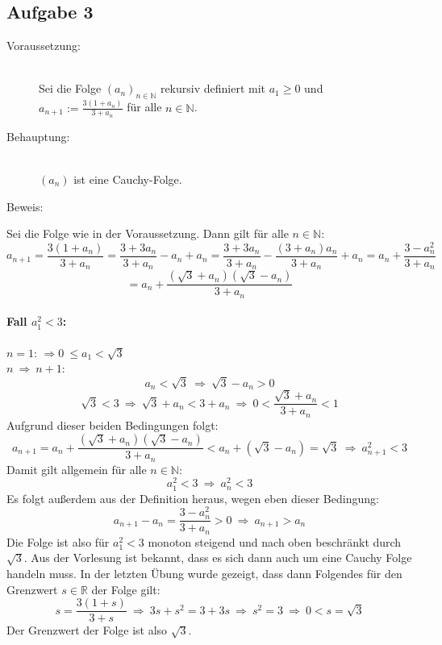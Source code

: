 \documentclass[10pt, a4paper]{article}
\begin{document}


	\newpage

	\subsection*{Aufgabe 3} %
	\label{sub:aufgabe_3}
	
		\begin{description}
			\item[Voraussetzung:] \hfill \\
				Sei die Folge $(a_n)_{n\in \mathbb{N}}$ rekursiv definiert mit $a_1\geq 0$ und \\
				$a_{n+1}:=\frac{3(1+a_n)}{3+a_n}$ für alle $n \in \mathbb{N}$.
			\item[Behauptung:] \hfill \\
				$(a_n)$ ist eine Cauchy-Folge.
			\item[Beweis:]
		\end{description}
		
			Sei die Folge wie in der Voraussetzung. Dann gilt für alle $n \in \mathbb{N}$:
			\[
				a_{n+1} = \dfrac{3(1+a_n)}{3+a_n} = \dfrac{3+3a_n}{3+a_n}-a_n+a_n = \dfrac{3+3a_n}{3+a_n} - \dfrac{(3+a_n)a_n}{3+a_n} +a_n = a_n + \dfrac{3-a_n^2}{3+a_n} 
			\]
			\[
				= a_n + \dfrac{(\sqrt{3}+a_n)(\sqrt{3}-a_n)}{3+a_n} 
			\]

			\paragraph{Fall $a_1^2<3$:} %
			\label{par:fall_}
			
				$n=1$: $\Rightarrow 0 \ \leq a_1 < \sqrt{3}$\\

				$n\ \Rightarrow \ n+1$:
				\[
					a_n < \sqrt{3} \ \Rightarrow \ \sqrt{3}-a_n > 0
				\]
				\[
					\sqrt{3} < 3 \ \Rightarrow \ \sqrt{3}+ a_n < 3+a_n \ \Rightarrow \ 0 < \dfrac{\sqrt{3}+a_n}{3+a_n} < 1
				\]
				Aufgrund dieser beiden Bedingungen folgt:
				\[
					a_{n+1} = a_n + \dfrac{(\sqrt{3}+a_n)(\sqrt{3}-a_n)}{3+a_n} < a_n + (\sqrt{3}-a_n) = \sqrt{3} \ \Rightarrow \ a_{n+1}^2 < 3
				\]
				Damit gilt allgemein für alle $n \in \mathbb{N}$:
				\[
					a_1^2 < 3 \ \Rightarrow \ a_n^2 < 3
				\]
				Es folgt außerdem aus der Definition heraus, wegen eben dieser Bedingung:
				\[
					a_{n+1}-a_n = \dfrac{3-a_n^2}{3+a_n} > 0 \ \Rightarrow \ a_{n+1} > a_n
				\]
				Die Folge ist also für $a_1^2<3$ monoton steigend und nach oben beschränkt durch $\sqrt{3}$. Aus der Vorlesung ist bekannt, dass es sich dann auch um eine Cauchy Folge handeln muss.
				In der letzten Übung wurde gezeigt, dass dann Folgendes für den Grenzwert $s \in \mathbb{R}$ der Folge gilt:
				\[
					s = \dfrac{3(1+s)}{3+s} \ \Rightarrow \ 3s+s^2=3+3s \ \Rightarrow \ s^2 = 3 \ \Rightarrow \ 0<s=\sqrt{3}
				\]
				Der Grenzwert der Folge ist also $\sqrt{3}$.


\end{document}
